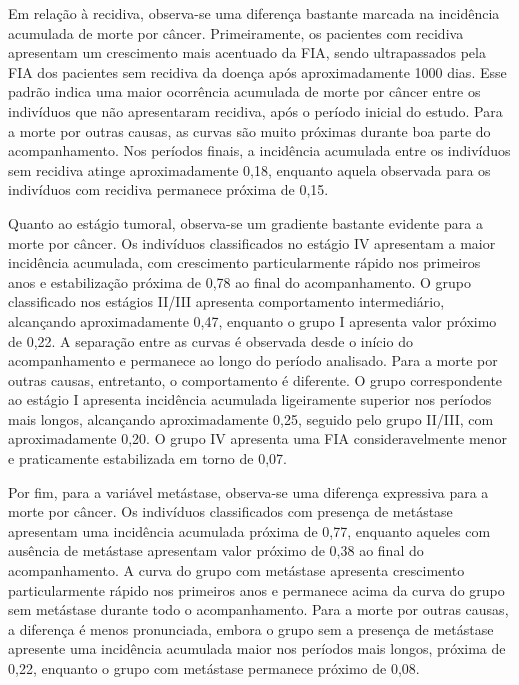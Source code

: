 \documentclass[11pt,a4paper]{article}
\begin{document}
Em relação à recidiva, observa-se uma diferença bastante marcada na incidência acumulada de morte por câncer. Primeiramente, os pacientes com recidiva apresentam um crescimento mais acentuado da FIA, sendo ultrapassados pela FIA dos pacientes sem recidiva da doença após aproximadamente 1000 dias. Esse padrão indica uma maior ocorrência acumulada de morte por câncer entre os indivíduos que não apresentaram recidiva, após o período inicial do estudo. Para a morte por outras causas, as curvas são muito próximas durante boa parte do acompanhamento. Nos períodos finais, a incidência acumulada entre os indivíduos sem recidiva atinge aproximadamente 0,18, enquanto aquela observada para os indivíduos com recidiva permanece próxima de 0,15. 

Quanto ao estágio tumoral, observa-se um gradiente bastante evidente para a morte por câncer. Os indivíduos classificados no estágio IV apresentam a maior incidência acumulada, com crescimento particularmente rápido nos primeiros anos e estabilização próxima de 0,78 ao final do acompanhamento. O grupo classificado nos estágios II/III apresenta comportamento intermediário, alcançando aproximadamente 0,47, enquanto o grupo I apresenta valor próximo de 0,22. A separação entre as curvas é observada desde o início do acompanhamento e permanece ao longo do período analisado. Para a morte por outras causas, entretanto, o comportamento é diferente. O grupo correspondente ao estágio I apresenta incidência acumulada ligeiramente superior nos períodos mais longos, alcançando aproximadamente 0,25, seguido pelo grupo II/III, com aproximadamente 0,20. O grupo IV apresenta uma FIA consideravelmente menor e praticamente estabilizada em torno de 0,07. 

Por fim, para a variável metástase, observa-se uma diferença expressiva para a morte por câncer. Os indivíduos classificados com presença de metástase apresentam uma incidência acumulada próxima de 0,77, enquanto aqueles com ausência de metástase apresentam valor próximo de 0,38 ao final do acompanhamento. A curva do grupo com metástase apresenta crescimento particularmente rápido nos primeiros anos e permanece acima da curva do grupo sem metástase durante todo o acompanhamento. Para a morte por outras causas, a diferença é menos pronunciada, embora o grupo sem a presença de metástase apresente uma incidência acumulada maior nos períodos mais longos, próxima de 0,22, enquanto o grupo com metástase permanece próximo de 0,08.
\end{document}
